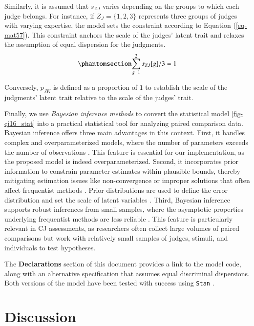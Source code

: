 \documentclass[
  authoryear,
  review,
  1p]{elsarticle}
\begin{document}
Similarly, it is assumed that \(s_{ZJ}\) varies depending on the groups
to which each judge belongs. For instance, if \(Z_{J} = \{1,2,3\}\)
represents three groups of judges with varying expertise, the model sets
the constraint according to Equation (\ref{eq-mat57}). This constraint
anchors the scale of the judges' latent trait and relaxes the assumption
of equal dispersion for the judgments.
\begin{equation}\phantomsection\label{eq-mat57}{
\sum_{g=1}^{2} s_{ZJ}[g]/3 = 1
}\end{equation}

Conversely, \(p_{JK}\) is defined as a proportion of \(1\) to establish
the scale of the judgments' latent trait relative to the scale of the
judges' trait.

Finally, we use \emph{Bayesian inference methods} to convert the
statistical model \ref{fig-cj16_stat} into a practical statistical tool
for analyzing paired comparison data. Bayesian inference offers three
main advantages in this context. First, it handles complex and
overparameterized models, where the number of parameters exceeds the
number of observations \citep{Baker_1998, Kim_et_al_1999}. This feature
is essential for our implementation, as the proposed model is indeed
overparameterized. Second, it incorporates prior information to
constrain parameter estimates within plausible bounds, thereby
mitigating estimation issues like non-convergence or improper solutions
that often affect frequentist methods
\citep{Martin_et_al_1975, Seaman_et_al_2011}. Prior distributions are
used to define the error distribution and set the scale of latent
variables \citep{Depaoli_2014}. Third, Bayesian inference supports
robust inferences from small samples, where the asymptotic properties
underlying frequentist methods are less reliable
\citep{Baldwin_et_al_2013, Lambert_et_al_2006, Depaoli_2014}. This
feature is particularly relevant in CJ assessments, as researchers often
collect large volumes of paired comparisons but work with relatively
small samples of judges, stimuli, and individuals to test hypotheses.

The \textbf{Declarations} section of this document provides a link to
the model code, along with an alternative specification that assumes
equal discriminal dispersions. Both versions of the model have been
tested with success using \texttt{Stan} \citep[version
2.26.1]{Stan_2020}.

\section{Discussion}\label{sec-discussion}
\end{document}
